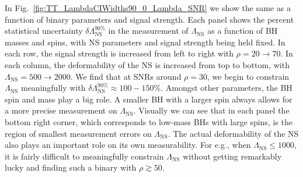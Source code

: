 \documentclass[aps,prd,amsmath,floats,floatfix, twocolumn,
superscriptaddress,nofootinbib,showpacs]{revtex4-1}
\newcommand{\lambdans}{\Lambda_\mathrm{NS}}
\newcommand{\dlambda}{\delta\lambdans^{90\%}}
\begin{document}
In Fig.~\ref{fig:TT_LambdaCIWidths90_0_Lambda_SNR} we show the same as a function
of binary parameters and signal strength. Each panel shows the percent statistical
uncertainty $\dlambda$ in the measurement of $\lambdans$ as a function of BH 
masses and spins, with NS parameters and signal strength being held fixed. 
In each row, the signal strength is increased from
left to right with $\rho = 20\rightarrow 70$. In each column, the deformability
of the NS is increased from top to bottom, with $\lambdans=500\rightarrow 2000$.
% 
We find that at SNRs around $\rho=30$, we begin to constrain $\lambdans$ 
meaningfully with $\dlambda\approx 100-150\%$. Amongst other parameters, 
the BH spin and mass play a big role. A smaller BH with a larger spin always
allows for a more precise measurement on $\lambdans$. Visually we can see that
in each panel the bottom right corner, which corresponds to low-mass BHs
with large spins, is the region of smallest measurement errors on $\lambdans$.
The actual deformability of the NS also plays an important role on its own
measurability. For e.g., when $\lambdans\leq 1000$, it is fairly difficult
to meaningfully constrain $\lambdans$ without getting remarkably lucky and
finding such a binary with $\rho\gtrsim 50$.
\end{document}

